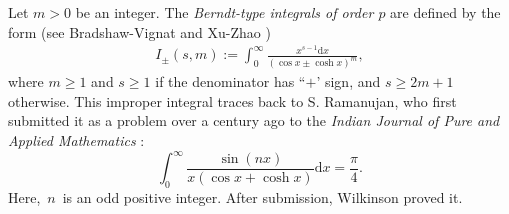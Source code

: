 \documentclass[11pt]{article}
\theoremstyle{plain}
\theoremstyle{definition}
\begin{document}
Let $m>0$ be an integer. The \emph{Berndt-type integrals of order $p$} are defined by the form (see Bradshaw-Vignat \cite{BV2024} and Xu-Zhao \cite{XZ2024})
\begin{align}\label{BTI-definition-1}
I_{\pm }(s,m):=\int_0^\infty \frac{x^{s-1}\mathrm{d}x}{(\cos x\pm\cosh x)^m},
\end{align}
where $m\geq 1$ and $s\geq 1$ if the denominator has ``$+$' sign, and $s\geq 2m+1$ otherwise. This improper integral traces back to S. Ramanujan, who first submitted it as a problem over a century ago to the \emph{Indian Journal of Pure and Applied Mathematics} \cite[pp. 325-326]{Rama1916}:
\begin{equation*}%
\int_0^\infty \frac{\sin(nx)}{x(\cos x+\cosh x)}\mathrm{d}x=\frac{\pi}{4}.
\end{equation*}
Here, $n$ is an odd positive integer.  After submission, Wilkinson \cite{W1916} proved it.
\end{document}
